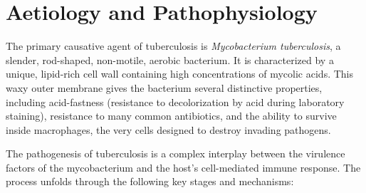 \section*{Aetiology and Pathophysiology}
The primary causative agent of tuberculosis is \textit{Mycobacterium tuberculosis}, a slender, rod-shaped, non-motile, aerobic bacterium. It is characterized by a unique, lipid-rich cell wall containing high concentrations of mycolic acids. This waxy outer membrane gives the bacterium several distinctive properties, including acid-fastness (resistance to decolorization by acid during laboratory staining), resistance to many common antibiotics, and the ability to survive inside macrophages, the very cells designed to destroy invading pathogens.

The pathogenesis of tuberculosis is a complex interplay between the virulence factors of the mycobacterium and the host's cell-mediated immune response. The process unfolds through the following key stages and mechanisms:


